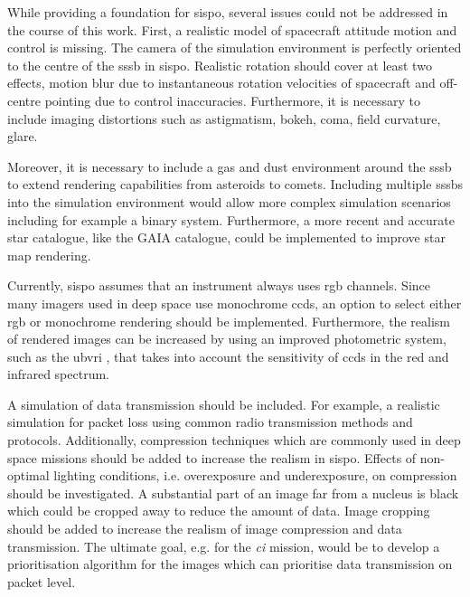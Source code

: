 While providing a foundation for \gls{sispo}, several issues could not be addressed in the course of this work. First, a realistic model of spacecraft attitude motion and control is missing. The camera of the simulation environment is perfectly oriented to the centre of the \gls{sssb} in \gls{sispo}. Realistic rotation should cover at least two effects, motion blur due to instantaneous rotation velocities of spacecraft and off-centre pointing due to control inaccuracies. Furthermore, it is necessary to include imaging distortions such as astigmatism, bokeh, coma, field curvature, glare.

Moreover, it is necessary to include a gas and dust environment around the \gls{sssb} to extend rendering capabilities from asteroids to comets. Including multiple \glspl{sssb} into the simulation environment would allow more complex simulation scenarios including  for example a binary system. Furthermore, a more recent and accurate star catalogue, like the GAIA catalogue, could be implemented to improve star map rendering.

Currently, \gls{sispo} assumes that an instrument always uses \gls{rgb} channels. Since many imagers used in deep space use monochrome \glspl{ccd}, an option to select either \gls{rgb} or monochrome rendering should be implemented. Furthermore, the realism of rendered images can be increased by using an improved photometric system, such as the \gls{ubvri} \cite{Bessell1993PhotometricSystems}, that takes into account the sensitivity of \glspl{ccd} in the red and infrared spectrum.

A simulation of data transmission should be included. For example, a realistic simulation for packet loss using common radio transmission methods and protocols. Additionally, compression techniques which are commonly used in deep space missions should be added to increase the realism in \gls{sispo}. Effects of non-optimal lighting conditions, i.e. overexposure and underexposure, on compression should be investigated. A substantial part of an image far from a nucleus is black which could be cropped away to reduce the amount of data. Image cropping should be added to increase the realism of image compression and data transmission. The ultimate goal, e.g. for the \textit{\gls{ci}} mission, would be to develop a prioritisation algorithm for the images which can prioritise data transmission on packet level.


